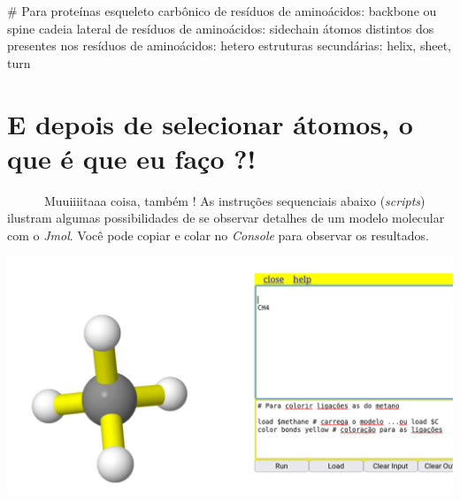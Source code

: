 \documentclass[
  letterpaper,
  DIV=11,
  numbers=noendperiod]{scrreprt}
\newenvironment{Shaded}{\begin{snugshade}}{\end{snugshade}}
\newcommand{\CommentTok}[1]{\textcolor[rgb]{0.37,0.37,0.37}{#1}}
\newcommand{\NormalTok}[1]{\textcolor[rgb]{0.00,0.23,0.31}{#1}}
\newcommand{\SpecialCharTok}[1]{\textcolor[rgb]{0.37,0.37,0.37}{#1}}
\begin{document}
\begin{Shaded}
\begin{Highlighting}[]
\CommentTok{\# Para proteínas}
\NormalTok{esqueleto carbônico de resíduos de aminoácidos}\SpecialCharTok{:}\NormalTok{ backbone ou spine}
\NormalTok{cadeia lateral de resíduos de aminoácidos}\SpecialCharTok{:}\NormalTok{ sidechain}
\NormalTok{átomos distintos dos presentes nos resíduos de aminoácidos}\SpecialCharTok{:}\NormalTok{ hetero}
\NormalTok{estruturas secundárias}\SpecialCharTok{:}\NormalTok{ helix, sheet, turn}
\end{Highlighting}
\end{Shaded}

\section{E depois de selecionar átomos, o que é que eu faço
?!}\label{sec-selecao}

~~~~~~Muuiiiitaaa coisa, também ! As instruções sequenciais abaixo
(\emph{scripts}) ilustram algumas possibilidades de se observar detalhes
de um modelo molecular com o \emph{Jmol}. Você pode copiar e colar no
\emph{Console} para observar os resultados.

\begin{Shaded}
\end{Shaded}

\includegraphics{metano.png}

\begin{Shaded}
\end{Shaded}
\end{document}
